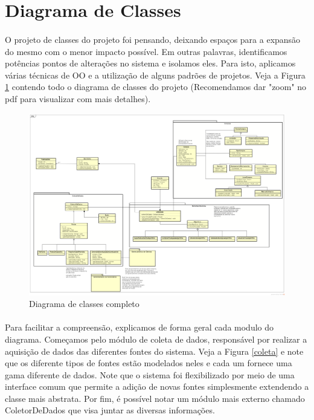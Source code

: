 \documentclass[a4paper,10pt]{article}
\begin{document}
\newpage
\section{Diagrama de Classes}

\paragraph{}
O projeto de classes do projeto foi pensando, deixando espaços para a expansão
do mesmo com o menor impacto possível. Em outras palavras, identificamos
potências pontos de alterações no sistema e isolamos eles. Para isto, aplicamos
várias técnicas de OO e a utilização de alguns padrões de projetos. Veja a
Figura \ref{dc} contendo todo o diagrama de classes do projeto (Recomendamos
dar "zoom" no pdf para visualizar com mais detalhes).

\begin{figure}[ht]
  \centering
  \includegraphics[width=1.3\textwidth, keepaspectratio=true]{images/classes.png}
  \caption {Diagrama de classes completo}
  \label {dc}
\end{figure}

\paragraph{}
Para facilitar a compreensão, explicamos de forma geral cada modulo do
diagrama. Começamos pelo módulo de coleta de dados, responsável por realizar
a aquisição de dados das diferentes fontes do sistema. Veja a Figura
\ref{coleta} e note que os diferente tipos de fontes estão modelados neles e
cada um fornece uma gama diferente de dados. Note que o sistema foi
flexibilizado por meio de uma interface comum que permite a adição de novas
fontes simplesmente extendendo a classe mais abstrata. Por fim, é possível
notar um módulo mais externo chamado ColetorDeDados que visa juntar as diversas
informações.
\end{document}
